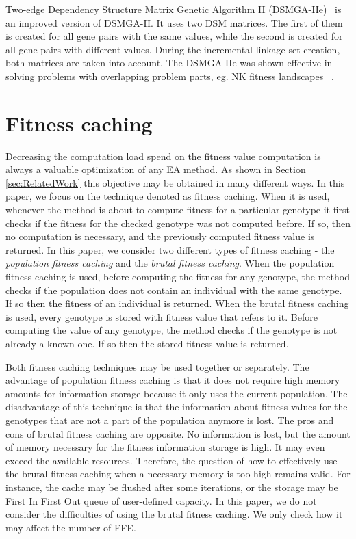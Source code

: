 Two-edge Dependency Structure Matrix Genetic Algorithm II (DSMGA-IIe)~\cite{dsmga2e} is an improved version of DSMGA-II. It uses two DSM matrices. The first of them is created for all gene pairs with the same values, while the second is created for all gene pairs with different values. During the incremental linkage set creation, both matrices are taken into account. The DSMGA-IIe was shown effective in solving problems with overlapping problem parts, eg. NK fitness landscapes ~\cite{dsmga2e}.

\section{Fitness caching}
\label{sec:FitnessCaching}

Decreasing the computation load spend on the fitness value computation is always a valuable optimization of any EA method. As shown in Section \ref{sec:RelatedWork} this objective may be obtained in many different ways. In this paper, we focus on the technique denoted as fitness caching. When it is used, whenever the method is about to compute fitness for a particular genotype it first checks if the fitness for the checked genotype was not computed before. If so, then no computation is necessary, and the previously computed fitness value is returned. In this paper, we consider two different types of fitness caching - the \textit{population fitness caching} and the \textit{brutal fitness caching}. When the population fitness caching is used, before computing the fitness for any genotype, the method checks if the population does not contain an individual with the same genotype. If so then the fitness of an individual is returned. When the brutal fitness caching is used, every genotype is stored with fitness value that refers to it. Before computing the value of any genotype, the method checks if the genotype is not already a known one. If so then the stored fitness value is returned. \par

Both fitness caching techniques may be used together or separately. The advantage of population fitness caching is that it does not require high memory amounts for information storage because it only uses the current population. The disadvantage of this technique is that the information about fitness values for the genotypes that are not a part of the population anymore is lost. The pros and cons of brutal fitness caching are opposite. No information is lost, but the amount of memory necessary for the fitness information storage is high. It may even exceed the available resources. Therefore, the question of how to effectively use the brutal fitness caching when a necessary memory is too high remains valid. For instance, the cache may be flushed after some iterations, or the storage may be First In First Out queue of user-defined capacity. In this paper, we do not consider the difficulties of using the brutal fitness caching. We only check how it may affect the number of FFE. 

